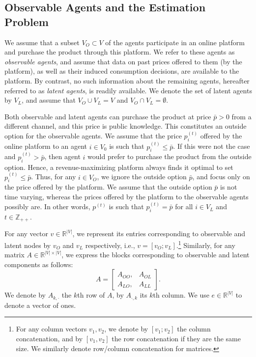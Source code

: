 \documentclass[opre,nonblindrev]{informs3} %
\newcommand{\rowdot}{\cdot}
\begin{document}
\subsection{Observable Agents and the Estimation Problem} \label{subse:SmallLatent}

We assume that  a subset $V_O\subset V$ of the agents
participate in an online platform and
purchase the product through this platform.
We refer to these agents as \emph{observable agents}, and assume that  data on past prices  offered to them (by the platform), as well as their induced consumption decisions, are available to the platform.
By contrast, no such  information  about the remaining agents, hereafter referred to as  \emph{latent agents}, is readily available.
We denote the set of latent agents by $V_L$, and assume that $V_O\cup V_L=V$ and $V_O \cap V_L = \emptyset$.


Both observable and latent agents can purchase the product at
price $\bar p>0$ from a different channel, and this price  is public knowledge. This constitutes an outside option for the observable agents. We assume that the price $p_i^{(t)}$ offered by the
online platform
 to an agent $i\in V_0$ is such that   $p_i^{(t)}\leq \bar{p}$.
If this were not the case and
$p_i^{(t)} > \bar{p}$, then agent $i$ would prefer to purchase the product from the outside option. Hence, a revenue-maximizing platform always finds it optimal to set $p_i^{(t)}\leq \bar{p}$. Thus, for any $i\in V_O$, we ignore the outside option $\bar p$, and focus only on the price offered by the platform.
We assume that the outside option $\bar{p}$ is not time varying, whereas the prices offered by the platform to the observable agents possibly are.
In other words,
${p}^{(t)}$
is such that $p_i^{(t)}=\bar{p}$ for all $i\in V_L$ and $t\in \mathbb{Z}_{++}$.


For any vector ${v}\in \mathbb{R}^{|V|}$, we represent its entries corresponding to observable and latent nodes by ${v}_O$ and ${v}_L$ respectively, i.e., ${v}=[{v}_O; {v}_L]$.\footnote{For any column vectors ${v}_1,{v}_2$, we denote by $[{v}_1; {v}_2]$ the column concatenation,
	and by $[{v}_1, {v}_2]$ the row concatenation if they are the same size. We similarly denote row/column concatenation for matrices.}
	Similarly, for any matrix $A\in \mathbb{R}^{|V|\times|V|}$, we express the blocks corresponding to observable and latent components as follows:
	\begin{equation*}
	A=
	\begin{bmatrix}
	A_{OO}, & A_{OL}\\ A_{LO}, & A_{LL}
	\end{bmatrix}.
	\end{equation*}
	We denote by $A_{k,\rowdot}$ the $k$th row of $A$,
	by
	$A_{\rowdot,k}$
 its $k$th column.
	We use ${e} \in \mathbb{R}^{|V|}$ to denote a vector of ones.
\end{document}
